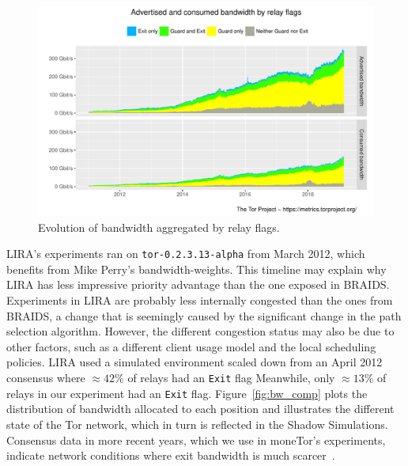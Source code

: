 \begin{figure}
  \includegraphics[scale=0.415]{images/bandwidth-flags-2011-01-01-2019-02-25.pdf}
  \caption{Evolution of bandwidth aggregated by relay flags.}
  \label{fig:bw_inequalities}
\end{figure}

LIRA's experiments ran on \texttt{tor-0.2.3.13-alpha} from March 2012, which benefits from Mike Perry's bandwidth-weights.
This timeline may explain why LIRA has less impressive priority advantage than the one exposed in BRAIDS.
Experiments in LIRA are probably less internally congested than the ones from BRAIDS, a change that is seemingly caused by the significant change in the path selection algorithm.
However, the different congestion status may also be due to other factors, such as a different client usage model and the local scheduling policies.
LIRA used a simulated environment scaled down from an April 2012 consensus where $\approx 42\%$ of relays had an \texttt{Exit} flag
Meanwhile, only $\approx 13\%$ of relays in our experiment had an \texttt{Exit} flag.
Figure~\ref{fig:bw_comp} plots the distribution of bandwidth allocated to each position and illustrates the different state of the Tor network, which in turn is reflected in the Shadow Simulations.
Consensus data in more recent years, which we use in moneTor's experiments, indicate network conditions where exit bandwidth is much scarcer~\cite{waterfilling-pets2017}.

